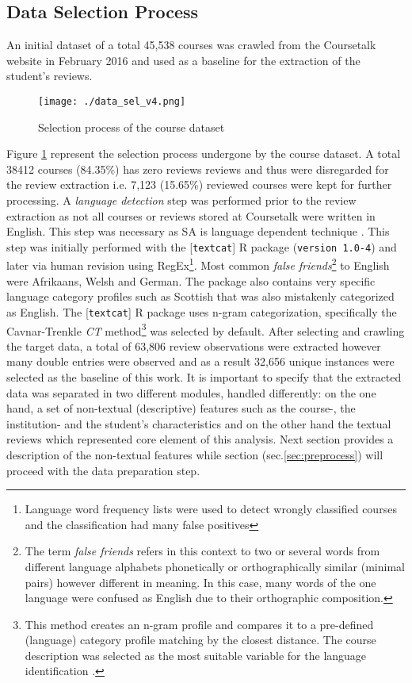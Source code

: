 \documentclass[
	a4paper,
	pdftex,
	12pt,	
	footinclude=true,
	fleqn,
	final,
	]{report}%
\begin{document}
\vspace{-0.45cm}
\subsection{Data Selection Process}
\label{subsec:selection}
\vspace{-0.3cm}
An initial dataset of a total 45,538 courses was crawled from the Coursetalk website in February 2016 and
used as a baseline for the extraction of the student's reviews.
\vspace{-0.03cm}
\begin{figure}[!h]
 \centering
 \texttt{[image: ./data\_sel\_v4.png]}
 \caption{Selection process of the course dataset}
 \label{fig:4}
\end{figure}

Figure \ref{fig:4} represent the selection process undergone by the course dataset. 
A total 38412 courses (84.35\%) has zero reviews reviews and thus were disregarded 
for the review extraction i.e. 7,123 (15.65\%) reviewed courses were kept for further processing. 
A \emph{language detection} step was performed prior to the 
review extraction as not all courses or reviews stored at Coursetalk 
were written in English. This step was necessary as 
SA is language dependent technique \cite{Liu2012a}. 
This step was initially performed with the [\texttt{textcat}] R package (\texttt{version 1.0-4}) 
and later via human revision using RegEx\footnote{Language word frequency lists were used to detect wrongly 
classified courses and the classification had many false positives}. 
Most common \emph{false friends}\footnote{
The term \emph{false friends} refers in this context to two or several words from different language alphabets
phonetically or orthographically similar (minimal pairs) however different in meaning. 
In this case, many words of the one language were confused as English due to their orthographic composition.} 
to English were Afrikaans, Welsh and German. The package also contains very specific language category profiles such 
as Scottish that was also mistakenly categorized as English. The [\texttt{textcat}] R package uses n-gram categorization, 
specifically the Cavnar-Trenkle \emph{CT} method\footnote{This method creates an n-gram profile and compares it to a pre-defined (language) category profile matching by the closest distance. The course 
description was selected as the most suitable variable for the language identification \cite{textcat2016}.}
\cite{textcat2016} was selected by default. After selecting and crawling the target data, a total of 63,806 review 
observations were extracted however many double entries were observed and as a 
result 32,656 unique instances were selected as the baseline of this work. It is important to specify 
that the extracted data was separated in two different modules, handled differently: 
on the one hand, a set of non-textual (descriptive) features such as the course-, the institution- and the student's characteristics 
and on the other hand the textual reviews which represented core element of this analysis. 
Next section provides a description of the non-textual features 
while section (sec.\ref{sec:preprocess}) will proceed with the data preparation step.
\vspace{-0.5cm}
\end{document}
